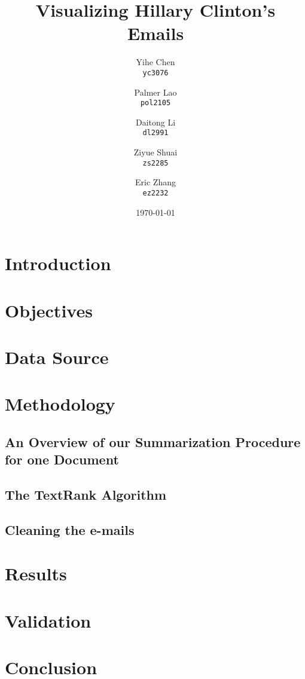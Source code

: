 \documentclass[11pt]{article}
\begin{document}
\title{Visualizing Hillary Clinton's Emails}

\author{
  Yihe Chen \\
  \texttt{yc3076}
  \and 
  Palmer Lao \\
  \texttt{pol2105}
  \and
  Daitong Li \\
  \texttt{dl2991}
  \and
  Ziyue Shuai \\
  \texttt{zs2285}
  \and
  Eric Zhang \\ 
  \texttt{ez2232}
}

\date{\today}
\maketitle
\doublespacing
\section{Introduction}

\section{Objectives}

\section{Data Source}

\section{Methodology}

\subsection{An Overview of our Summarization Procedure for one Document}


\subsection{The TextRank Algorithm}


\subsection{Cleaning the e-mails}


\section{Results}

\section{Validation}

\section{Conclusion}



\end{document}
